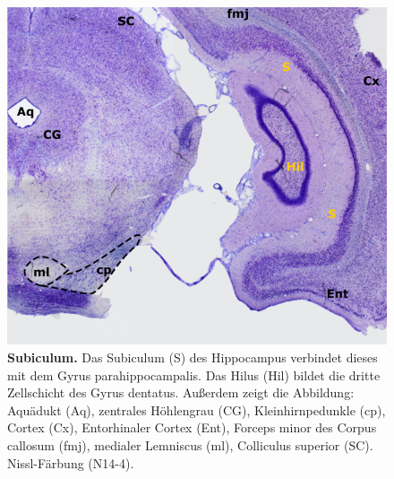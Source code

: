 \documentclass[12pt,a4paper,pdftex]{article}
\begin{document}
\begin{figure}[H]
    \centering
    \includegraphics{pictures/Basalganglia/Subiculum.png}
    \caption[Subiculum]{\textbf{Subiculum.} Das Subiculum (S) des Hippocampus verbindet dieses mit dem Gyrus parahippocampalis. Das Hilus (Hil) bildet die dritte Zellschicht des Gyrus dentatus. Außerdem zeigt die Abbildung: 
    Aquädukt (Aq), zentrales Höhlengrau (CG), Kleinhirnpedunkle (cp), Cortex (Cx), Entorhinaler Cortex (Ent), Forceps minor des Corpus callosum (fmj), medialer Lemniscus (ml), Colliculus superior (SC). Nissl-Färbung (N14-4).}
    \label{fig:hippo_subiculum}
\end{figure}
\end{document}
